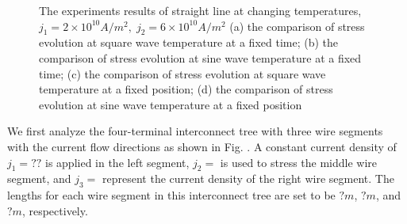 \begin{figure}[!h]
\centering
{}
\caption{The experiments results of straight line at changing temperatures, $j_1=2\times10^{10}A/m^2,\;j_2=6\times10^{10}A/m^2$ (a) the comparison of stress evolution at square wave temperature at a fixed time; (b) the comparison of stress evolution at sine wave temperature at a fixed time; (c) the comparison of stress evolution at square wave temperature at a fixed position; (d) the comparison of stress evolution at sine wave temperature at a fixed position}
\label{fig:S3Results2}
\end{figure}

We first analyze the four-terminal interconnect tree with three wire segments with the current flow directions as shown in Fig. \cite{}. A constant current density of $j_1=??$ is applied in the left segment, $j_2=$ is used to stress the middle wire segment, and $j_3=$ represent the current density of the right wire segment. The lengths for each wire segment in this interconnect tree are set to be $?m$, $?m$, and $?m$, respectively.



